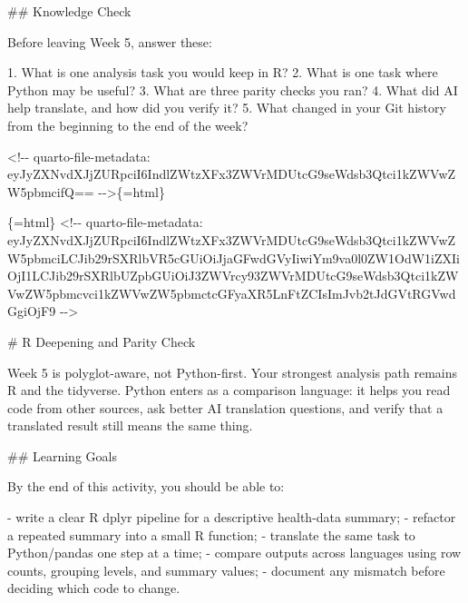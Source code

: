 \documentclass[
  letterpaper,
  DIV=11,
  numbers=noendperiod,
  oneside]{scrreprt}
\newenvironment{Shaded}{\begin{snugshade}}{\end{snugshade}}
\newcommand{\FunctionTok}[1]{\textcolor[rgb]{0.28,0.35,0.67}{#1}}
\newcommand{\InformationTok}[1]{\textcolor[rgb]{0.37,0.37,0.37}{#1}}
\newcommand{\NormalTok}[1]{\textcolor[rgb]{0.00,0.23,0.31}{#1}}
\newcommand{\SpecialStringTok}[1]{\textcolor[rgb]{0.13,0.47,0.30}{#1}}
\begin{document}
\begin{Shaded}
\begin{Highlighting}[numbers=left,,]
\FunctionTok{\#\# Knowledge Check}

\NormalTok{Before leaving Week 5, answer these:}

\SpecialStringTok{1. }\NormalTok{What is one analysis task you would keep in R?}
\SpecialStringTok{2. }\NormalTok{What is one task where Python may be useful?}
\SpecialStringTok{3. }\NormalTok{What are three parity checks you ran?}
\SpecialStringTok{4. }\NormalTok{What did AI help translate, and how did you verify it?}
\SpecialStringTok{5. }\NormalTok{What changed in your Git history from the beginning to the end of the week?}


\InformationTok{\textasciigrave{}\textless{}!{-}{-} quarto{-}file{-}metadata: eyJyZXNvdXJjZURpciI6IndlZWtzXFx3ZWVrMDUtcG9seWdsb3Qtci1kZWVwZW5pbmcifQ== {-}{-}\textgreater{}\textasciigrave{}}\NormalTok{\{=html\}}

\InformationTok{\textasciigrave{}\textasciigrave{}\textasciigrave{}\{=html\}}
\InformationTok{\textless{}!{-}{-} quarto{-}file{-}metadata: eyJyZXNvdXJjZURpciI6IndlZWtzXFx3ZWVrMDUtcG9seWdsb3Qtci1kZWVwZW5pbmciLCJib29rSXRlbVR5cGUiOiJjaGFwdGVyIiwiYm9va0l0ZW1OdW1iZXIiOjI1LCJib29rSXRlbUZpbGUiOiJ3ZWVrcy93ZWVrMDUtcG9seWdsb3Qtci1kZWVwZW5pbmcvci1kZWVwZW5pbmctcGFyaXR5LnFtZCIsImJvb2tJdGVtRGVwdGgiOjF9 {-}{-}\textgreater{}}
\InformationTok{\textasciigrave{}\textasciigrave{}\textasciigrave{}}

\FunctionTok{\# R Deepening and Parity Check }


\NormalTok{Week 5 is polyglot{-}aware, not Python{-}first. Your strongest analysis path remains R and the tidyverse. Python enters as a comparison language: it helps you read code from other sources, ask better AI translation questions, and verify that a translated result still means the same thing.}

\FunctionTok{\#\# Learning Goals}

\NormalTok{By the end of this activity, you should be able to:}

\SpecialStringTok{{-} }\NormalTok{write a clear R }\InformationTok{\textasciigrave{}dplyr\textasciigrave{}}\NormalTok{ pipeline for a descriptive health{-}data summary;}
\SpecialStringTok{{-} }\NormalTok{refactor a repeated summary into a small R function;}
\SpecialStringTok{{-} }\NormalTok{translate the same task to Python/pandas one step at a time;}
\SpecialStringTok{{-} }\NormalTok{compare outputs across languages using row counts, grouping levels, and summary values;}
\SpecialStringTok{{-} }\NormalTok{document any mismatch before deciding which code to change.}


\end{Highlighting}
\end{Shaded}
\end{document}
